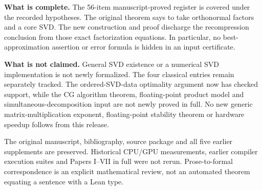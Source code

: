 \textbf{What is complete.} The 56-item manuscript-proved register is covered under the recorded hypotheses. The original theorem says to take orthonormal factors and a core SVD. The new construction and proof discharge the recompression conclusion from those exact factorization equations. In particular, no best-approximation assertion or error formula is hidden in an input certificate.

\textbf{What is not claimed.} General SVD existence or a numerical SVD implementation is not newly formalized. The four classical entries remain separately tracked. The ordered-SVD-data optimality argument now has checked support, while the CG algorithm theorem, floating-point product model and simultaneous-decomposition input are not newly proved in full. No new generic matrix-multiplication exponent, floating-point stability theorem or hardware speedup follows from this release.

The original manuscript, bibliography, source package and all five earlier supplements are preserved. Historical CPU/GPU measurements, earlier compiler execution suites and Papers I--VII in full were not rerun. Prose-to-formal correspondence is an explicit mathematical review, not an automated theorem equating a sentence with a Lean type.
